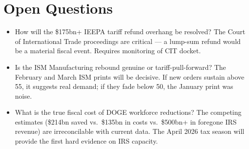 \documentclass{wilson-report}
\begin{document}
\section*{Open Questions}
\small
\begin{itemize}[leftmargin=1.2em, itemsep=4pt]
  \item How will the \$175bn+ IEEPA tariff refund overhang be resolved? The Court of International Trade proceedings are critical --- a lump-sum refund would be a material fiscal event. Requires monitoring of CIT docket.
  \item Is the ISM Manufacturing rebound genuine or tariff-pull-forward? The February and March ISM prints will be decisive. If new orders sustain above 55, it suggests real demand; if they fade below 50, the January print was noise.
  \item What is the true fiscal cost of DOGE workforce reductions? The competing estimates (\$214bn saved vs.\ \$135bn in costs vs.\ \$500bn+ in foregone IRS revenue) are irreconcilable with current data. The April 2026 tax season will provide the first hard evidence on IRS capacity.
\end{itemize}

\end{document}
